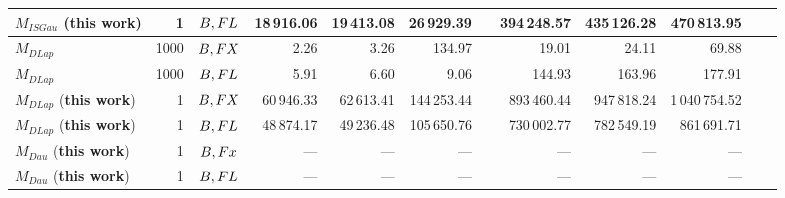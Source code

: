 \begin{table}
{\begin{tabular}{ l r c r r r r r r r r r}
            \midrule
            $M_{ISGau}$ (\textbf{this work})                     & 1       & $B,FL$ & 18\,916.06              & 19\,413.08 & 26\,929.39              &  & 394\,248.57 & 435\,126.28 & 470\,813.95    \\
            \midrule
            $M_{DLap}$~\cite{eigner2014differentially}           & 1000    & $B,FX$ & 2.26                    & 3.26       & 134.97                  &  & 19.01       & 24.11       & 69.88          \\
            $M_{DLap}$~\cite{eigner2014differentially}           & 1000    & $B,FL$ & 5.91                    & 6.60       & 9.06                    &  & 144.93      & 163.96      & 177.91         \\
            $M_{DLap}$ (\textbf{this work})                      & 1       & $B,FX$ & 60\,946.33              & 62\,613.41 & 144\,253.44             &  & 893\,460.44 & 947\,818.24 & 1\,040\,754.52 \\
            $M_{DLap}$ (\textbf{this work})                      & 1       & $B,FL$ & 48\,874.17              & 49\,236.48 & 105\,650.76             &  & 730\,002.77 & 782\,549.19 & 861\,691.71    \\
            \midrule
            $M_{Dau}$ (\textbf{this work})                       & 1       & $B,Fx$ & ---                     & ---        & ---                     &  & ---         & ---         & ---            \\
            $M_{Dau}$ (\textbf{this work})                       & 1       & $B,FL$ & ---                     & ---        & ---                     &  & ---         & ---         & ---            \\
            \bottomrule
        \end{tabular}
    }
\end{table}
\FloatBarrier














